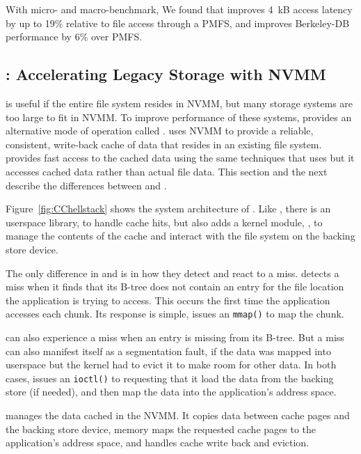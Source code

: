 With micro- and macro-benchmark, We found that \DAChell{} improves 4~kB access
latency by up to 19\% relative to file access through a PMFS, and improves
Berkeley-DB performance by 6\% over PMFS.

\subsection{\CChell{}: Accelerating Legacy Storage with NVMM}
\label{sec:overview}

\DAChell{} is useful if the entire file system resides in NVMM, but many
storage systems are too large to fit in NVMM.  To improve
performance of these systems, \Chell{} provides an alternative mode of
operation called \CChell{}.  \CChell{} uses NVMM to provide a reliable,
consistent, write-back cache of data that resides in an existing file system.
\CChell{} provides fast access to the cached data using the same techniques
that \DAChell{} uses but it accesses cached data rather than actual file data.
This section and the next describe the differences between \CChell{}
and \DAChell{}.

Figure~\ref{fig:CChellstack} shows the system architecture of \CChell{}.
Like \DAChell{}, there is an userspace library, \lib{} to handle cache
hits, but \CChell{} also adds a kernel module, \drv{}, to
manage the contents of the cache and interact with the file system on the
backing store device.

The only difference in \libd{} and \lib{} is in
how they detect and react to a miss.  \Libd{} detects a miss when it
finds that its B-tree does not contain an entry for the file location the
application is trying to access.  This occurs the first time the application
accesses each chunk.  Its response is simple, issues an \texttt{mmap()} to map
the chunk.

\Lib{} can also experience a miss when an entry is missing from its B-tree.
But a miss can also manifest itself as a segmentation fault, if the data was
mapped into userspace but the kernel had to evict it to make room for other
data.
In both cases, \lib{} issues an \texttt{ioctl()} to \drv{} requesting that
it load the data from the backing store (if needed), and then map the data into
the application's address space.

\Drv{} manages the data cached in the NVMM.
It copies data between cache pages and the backing store device,
memory maps the requested cache pages to the application's address space,
and handles cache write back and eviction.

